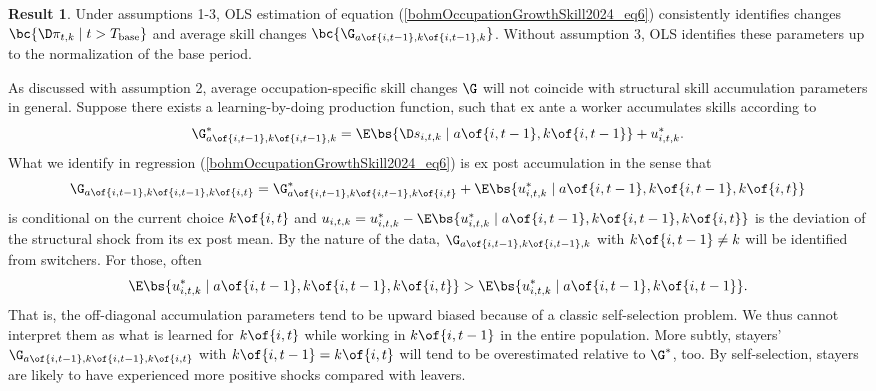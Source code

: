 \documentclass[12pt]{article}
\theoremstyle{definition}
\newtheorem{result}{Result}
\begin{document}
\begin{result}
Under assumptions 1-3, OLS estimation of equation (\ref{bohmOccupationGrowthSkill2024_eq6}) consistently identifies changes \\
$\bc{\D \pi_{t,k} \mid t > T_{\text{base}}}$ and average skill changes $\bc{\G_{a\of{i, t-1}, k\of{i, t-1}, k}}$. Without assumption 3, OLS identifies these parameters up to the normalization of the base period.
\end{result}

As discussed with assumption 2, average occupation-specific skill changes $\G$ will not coincide with structural skill accumulation parameters in general. Suppose there exists a learning-by-doing production function, such that ex ante a worker accumulates skills according to 
\begin{equation}
    \notag 
    \G^*_{a\of{i, t-1}, k\of{i, t-1}, k} = \E\bs{\D s_{i, t, k} \mid a\of{i, t-1}, k\of{i, t-1}} + u^*_{i, t, k}.
\end{equation}
What we identify in regression (\ref{bohmOccupationGrowthSkill2024_eq6}) is ex post accumulation in the sense that 
\begin{equation}
    \label{bohmOccupationGrowthSkill2024_eq7}
    \G_{a\of{i, t-1}, k\of{i, t-1}, k\of{i,t}} = \G^*_{a\of{i, t-1}, k\of{i, t-1}, k\of{i,t}} + \E\bs{u^*_{i, t, k} \mid a\of{i, t-1}, k\of{i, t-1}, k\of{i,t}}
\end{equation}
is conditional on the current choice $k\of{i,t}$ and $u_{i,t,k} = u^*_{i, t, k} - \E\bs{u^*_{i, t, k} \mid a\of{i, t-1}, k\of{i, t-1}, k\of{i,t}}$ is the deviation of the structural shock from its ex post mean. By the nature of the data, $\G_{a\of{i,t-1}, k\of{i,t-1}, k}$ with $k\of{i, t-1} \neq k$ will be identified from switchers. For those, often 
\begin{equation}
    \notag 
    \E\bs{u^*_{i, t, k} \mid a\of{i, t-1}, k\of{i, t-1}, k\of{i,t}} > \E\bs{u_{i,t,k}^* \mid a\of{i, t-1}, k\of{i, t-1}}.
\end{equation}
That is, the off-diagonal accumulation parameters tend to be upward biased because of a classic self-selection problem. We thus cannot interpret them as what is learned for $k\of{i,t}$ while working in $k\of{i, t-1}$ in the entire population. More subtly, stayers' $\G_{a\of{i,t-1}, k\of{i,t-1}, k\of{i,t}}$ with $k\of{i,t-1} = k\of{i,t}$ will tend to be overestimated relative to $\G^*$, too. By self-selection, stayers are likely to have experienced more positive shocks compared with leavers.
\end{document}
